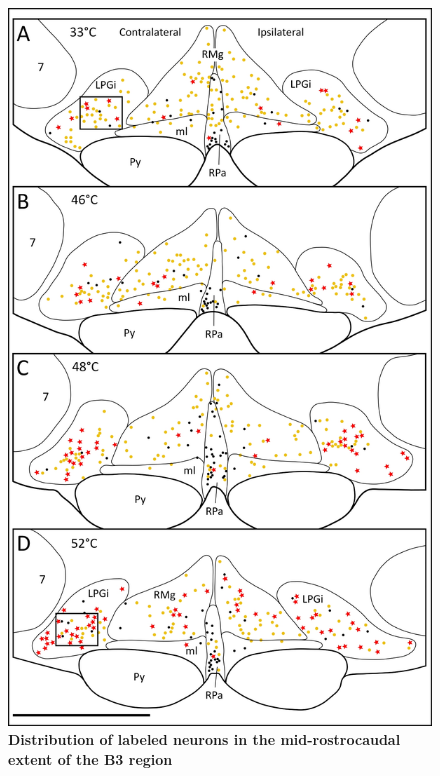 \documentclass[a4paper,12pt,twoside]{report}
\begin{document}
\begin{figure}[p]

\begin{center}
 \includegraphics[scale=0.9]{Article2-FIG3.jpg} 
\end{center}

\caption{\textbf{Distribution of labeled neurons in the mid-rostrocaudal extent of the B3 region}}


\end{figure}
\end{document}

